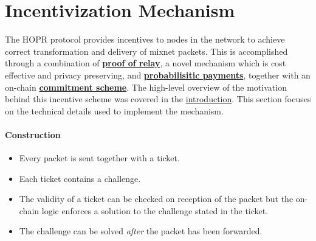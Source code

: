 \section{Incentivization Mechanism}
\label{sec:incentiviationmechanism}

The HOPR protocol provides incentives to nodes in the network to achieve correct transformation and delivery of mixnet packets. This is accomplished through a combination of \href{sec:proofofrelay}{\textbf{proof of relay}}, a novel mechanism which is cost effective and privacy preserving, and \href{sec:probabilisticpayments}{\textbf{probabilisitic payments}}, together with an on-chain \href{sec:onchaincommitment}{\textbf{commitment scheme}}. The high-level overview of the motivation behind this incentive scheme was covered in the \href{sec:introduction}{introduction}. This section focuses on the technical details used to implement the mechanism.

\paragraph{Construction}

\begin{itemize}
    \item Every packet is sent together with a ticket.
    \item Each ticket contains a challenge.
    \item The validity of a ticket can be checked on reception of the packet but the on-chain logic enforces a solution to the challenge stated in the ticket.
    \item The challenge can be solved \textit{after} the packet has been forwarded.
\end{itemize}






